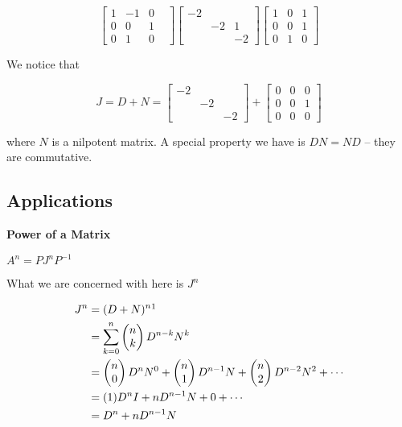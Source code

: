\begin{example}
	\[\begin{bmatrix}
		1&-1&0\\0&0&1&\\0&1&0
	\end{bmatrix} \begin{bmatrix}
		-2&&\\&-2&1\\&&-2
	\end{bmatrix} \begin{bmatrix}
		1&0&1\\0&0&1\\0&1&0
	\end{bmatrix}\]

	We notice that

	\[J = D + N = \begin{bmatrix}
		-2&&\\&-2&\\&&-2
	\end{bmatrix} + \begin{bmatrix}
		0&0&0\\0&0&1\\0&0&0
	\end{bmatrix}\]

	where $N$ is a nilpotent matrix. A special property we have is $DN = ND$ -- they are commutative.
\end{example}

\subsection{Applications}

\textbf{Power of a Matrix}

$A^n = PJ^nP^{-1}$

What we are concerned with here is $J^n$

\begin{align*}
	J^n &= (D+N)^n\footnotemark\\
	&= \sum_{k=0}^{n} \begin{pmatrix}
		n\\k
	\end{pmatrix} D^{n-k} N^{k}\\
	&= \begin{pmatrix}
		n\\0
	\end{pmatrix} D^n N^0 + \begin{pmatrix}
		n\\1
	\end{pmatrix} D^{n-1} N + \begin{pmatrix}
		n\\2
	\end{pmatrix} D^{n-2} N^2 + \cdots\\
	&= (1)D^n I + n D^{n-1} N + 0 + \cdots\\
	&= D^n + n D^{n-1} N
\end{align*}


